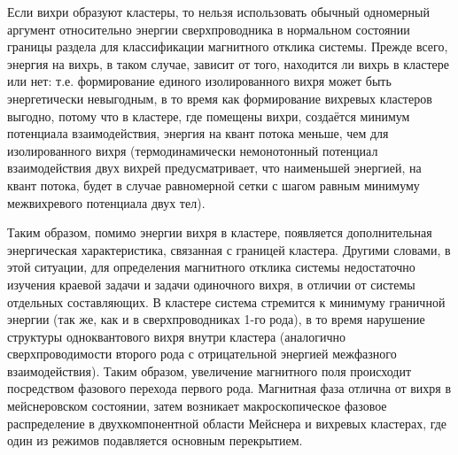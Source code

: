 Если вихри образуют кластеры, то нельзя использовать обычный одномерный 
аргумент относительно энергии сверхпроводника в нормальном состоянии границы 
раздела для классификации магнитного отклика системы. Прежде всего, энергия 
на вихрь, в таком случае, зависит от того, находится ли вихрь в кластере или 
нет: т.е. формирование единого изолированного вихря может быть энергетически 
невыгодным, в то время как формирование вихревых кластеров выгодно, потому что 
в кластере, где помещены вихри, создаётся минимум потенциала взаимодействия, 
энергия на квант потока меньше, чем для изолированного вихря (термодинамически 
немонотонный потенциал взаимодействия двух вихрей предусматривает, что 
наименьшей энергией, на квант потока, будет в случае равномерной сетки с шагом 
равным минимуму межвихревого потенциала двух тел).

Таким образом, помимо энергии вихря в кластере, появляется дополнительная 
энергическая характеристика, связанная с границей кластера. Другими словами, в 
этой ситуации, для определения магнитного отклика системы недостаточно 
изучения краевой задачи и задачи одиночного вихря, в отличии от системы 
отдельных составляющих. В кластере система стремится к минимуму граничной 
энергии (так же, как и в сверхпроводниках 1-го рода), в то время нарушение 
структуры одноквантового вихря внутри кластера (аналогично сверхпроводимости 
второго рода с отрицательной энергией межфазного взаимодействия). Таким 
образом, увеличение магнитного поля происходит посредством фазового перехода 
первого рода. Магнитная фаза отлична от вихря в мейснеровском состоянии, затем 
возникает макроскопическое фазовое распределение в двухкомпонентной области 
Мейснера и вихревых кластерах, где один из режимов подавляется основным 
перекрытием. \cite{bib:main}

\newpage